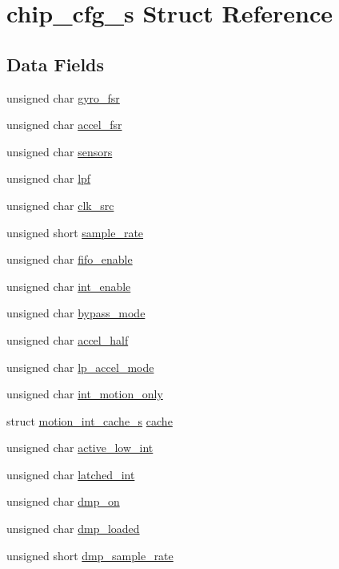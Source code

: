 \hypertarget{structchip__cfg__s}{}\section{chip\+\_\+cfg\+\_\+s Struct Reference}
\label{structchip__cfg__s}
\subsection*{Data Fields}
\begin{DoxyCompactItemize}
\item 
unsigned char \hyperlink{structchip__cfg__s_abae9129fae33706b5f73b2b1867fcc89}{gyro\+\_\+fsr}
\item 
unsigned char \hyperlink{structchip__cfg__s_a97d5de8aa2fab5cc81ca2180130fc6ac}{accel\+\_\+fsr}
\item 
unsigned char \hyperlink{structchip__cfg__s_aaa21c01566947e7007476657cb614e3f}{sensors}
\item 
unsigned char \hyperlink{structchip__cfg__s_a0a4067140c6a3704b4312ba62b77aadb}{lpf}
\item 
unsigned char \hyperlink{structchip__cfg__s_a2ac4d2f6d885669a21842e13dd3c5241}{clk\+\_\+src}
\item 
unsigned short \hyperlink{structchip__cfg__s_a1aa4e026c4d2f691506f2d713a405aea}{sample\+\_\+rate}
\item 
unsigned char \hyperlink{structchip__cfg__s_a1f258910658cfcf4bed56c0de8637441}{fifo\+\_\+enable}
\item 
unsigned char \hyperlink{structchip__cfg__s_ab0cc290f4f43cd8a8b6562a97f540493}{int\+\_\+enable}
\item 
unsigned char \hyperlink{structchip__cfg__s_a2dd3f2719bc8ed1946811203ec330905}{bypass\+\_\+mode}
\item 
unsigned char \hyperlink{structchip__cfg__s_af73df77287fdeba8d408c18f3905650f}{accel\+\_\+half}
\item 
unsigned char \hyperlink{structchip__cfg__s_aeb8fb45fc306b199be68b3f61940fbb0}{lp\+\_\+accel\+\_\+mode}
\item 
unsigned char \hyperlink{structchip__cfg__s_a28c5c373e0d7189a11c4ae5ca351ca30}{int\+\_\+motion\+\_\+only}
\item 
struct \hyperlink{structmotion__int__cache__s}{motion\+\_\+int\+\_\+cache\+\_\+s} \hyperlink{structchip__cfg__s_aab21a113d97da9c015f6f1928662927b}{cache}
\item 
unsigned char \hyperlink{structchip__cfg__s_ac576d810c0c8bcd73af5908c10a83c3a}{active\+\_\+low\+\_\+int}
\item 
unsigned char \hyperlink{structchip__cfg__s_a6c37b8cd7cf4fd08a3200129cd23255c}{latched\+\_\+int}
\item 
unsigned char \hyperlink{structchip__cfg__s_a49fb51079238683b21264827348b5968}{dmp\+\_\+on}
\item 
unsigned char \hyperlink{structchip__cfg__s_afc32c3e58317c589014257dc9b1ee04b}{dmp\+\_\+loaded}
\item 
unsigned short \hyperlink{structchip__cfg__s_a5d17c6049cc8cb74faf5cdb942988294}{dmp\+\_\+sample\+\_\+rate}
\end{DoxyCompactItemize}


